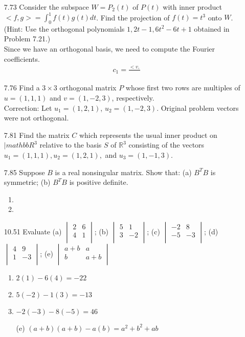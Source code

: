\documentclass[12pt]{article}
\theoremstyle{definition}
\theoremstyle{plain}
\begin{document}
\begin{enumerate}
\item[7.73]Consider the subspace $W=P_2(t)$ of $P(t)$ with inner product $<f,g>=\int_0^1f(t)g(t)dt$. Find the projection of $f(t)=t^3$ onto $W$. (Hint: Use the orthogonal polynomials $1,2t-1,6t^2-6t+1$ obtained in Problem 7.21.)\\
	Since we have an orthogonal basis, we need to compute the Fourier coefficients.
	\begin{align*}
	c_1=\frac{<v,}{}
	\end{align*}

\item[7.76]Find a $3\times 3$ orthogonal matrix $P$ whose first two rows are multiples of $u=(1,1,1)$ and $v=(1,-2,3)$, respectively.\\
Correction: Let $u_1=(1,2,1)$, $u_2=(1,-2,3)$. Original problem vectors were not orthogonal.

\item[7.81]Find the matrix $C$ which represents the usual inner product on $|mathbb{R}^3$ relative to the basis $S$ of $\mathbb{R}^3$ consisting of the vectors $u_1=(1,1,1),u_2=(1,2,1),$ and $u_3=(1,-1,3)$.

\item[7.85]Suppose $B$ is a real nonsingular matrix. Show that: (a) $B^TB$ is symmetric; (b) $B^TB$ is positive definite.
	\begin{enumerate}
	\item
	\item
	\end{enumerate}

\item[10.51]Evaluate (a) $\begin{vmatrix}2&6\\4&1\\\end{vmatrix}$; (b) $\begin{vmatrix}5&1\\3&-2\\\end{vmatrix}$; (c) $\begin{vmatrix}-2&8\\-5&-3\\\end{vmatrix}$; (d) $\begin{vmatrix}4&9\\1&-3\\\end{vmatrix}$; (e) $\begin{vmatrix}a+b&a\\b&a+b\\\end{vmatrix}$
	\begin{enumerate}
	\item $2(1)-6(4) = -22$
	\item $5(-2)-1(3) = -13$
	\item $-2(-3)-8(-5) = 46$
	\item[(e)] $(a+b)(a+b)-a(b) = a^2+b^2+ab$
	\end{enumerate}


\end{enumerate}
\end{document}
